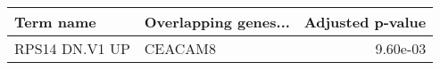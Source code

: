 \begin{tabular}{llr}
\toprule
     Term name & Overlapping genes... &  Adjusted p-value \\
\midrule
RPS14 DN.V1 UP &              CEACAM8 &          9.60e-03 \\
\bottomrule
\end{tabular}
